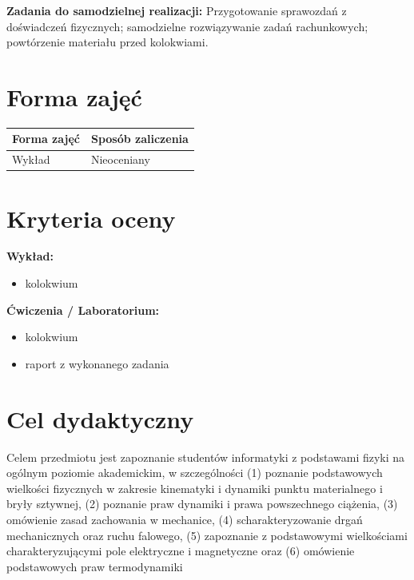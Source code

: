 \documentclass[12pt, a4paper]{article}
\newcommand{\thdrule}{\noalign{\global\setlength{\extrarowheight}{0pt}}}
\newcommand{\thdend}{\noalign{\global\setlength{\extrarowheight}{3pt}}}
\begin{document}
\vspace{4pt}
\noindent\textbf{Zadania do samodzielnej realizacji:} Przygotowanie sprawozdań z doświadczeń fizycznych; samodzielne rozwiązywanie zadań rachunkowych; powtórzenie materiału przed kolokwiami.

\section{Forma zajęć}

\begin{center}
{\scriptsize
\begin{tabular}{m{5cm}m{8cm}}
\thdrule\toprule
\rowcolor{pjatkRed} {\color{white}\textbf{Forma zajęć}} & {\color{white}\textbf{Sposób zaliczenia}} \\
\midrule\thdend
  \rowcolor{tableRowLight} Wykład & Nieoceniany \\
\bottomrule
\end{tabular}}
\end{center}

\section{Kryteria oceny}

\textbf{Wykład:}
\begin{itemize}
  \item kolokwium
\end{itemize}
\vspace{4pt}
\textbf{Ćwiczenia / Laboratorium:}
\begin{itemize}
  \item kolokwium
  \item raport z wykonanego zadania
\end{itemize}


\section{Cel dydaktyczny}

Celem przedmiotu jest zapoznanie studentów informatyki z podstawami fizyki na ogólnym poziomie akademickim, w szczególności (1) poznanie podstawowych wielkości fizycznych w zakresie kinematyki i dynamiki punktu materialnego i bryły sztywnej, (2) poznanie praw dynamiki i prawa powszechnego ciążenia, (3) omówienie zasad zachowania w mechanice, (4) scharakteryzowanie drgań mechanicznych oraz ruchu falowego, (5) zapoznanie z podstawowymi wielkościami charakteryzującymi pole elektryczne i magnetyczne oraz (6) omówienie podstawowych praw termodynamiki
\end{document}
